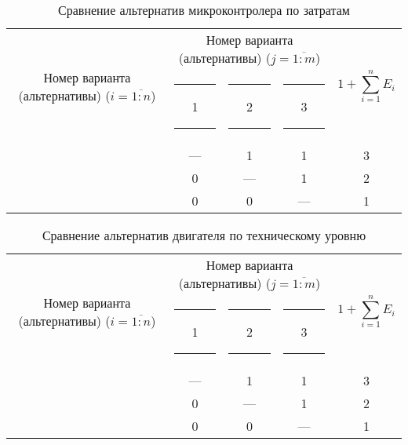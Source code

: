 \begin{table}[ht!]
    \centering
    \begin{tabular}{|c|c|c|c|c|}
        \hline
        \multirow{2}{2.4cm}[-0.5pc]{
            \centering
            Номер варианта (альтернативы) ($i = \overline{1:n}$)
        } &
        \multicolumn{3}{c|}{
            \parbox[t]{2.4cm}{
                \centering
                Номер варианта (альтернативы) ($j = \overline{1:m}$)
            }
        } &
        \multirow{2}{1.7cm}{
            \centering
            $$1 + \sum_{i=1}^n E_i$$
        } \\
        &
        \centering \rule{2pt}{0pt} 1 \rule{2pt}{0pt} &
        \centering \rule{2pt}{0pt} 2 \rule{2pt}{0pt} &
        \centering \rule{2pt}{0pt} 3 \rule{2pt}{0pt} & \\
        \hline \hline
        \centering{1} &---& 1 & 1 & 3 \\ \hline
        \centering{2} & 0 &---& 1 & 2 \\ \hline
        \centering{3} & 0 & 0 &---& 1 \\ \hline
    \end{tabular}
    \caption{Сравнение альтернатив микроконтролера по затратам}
    \label{tbl_mcu_cost_lvl_comparison}
\end{table}

\begin{table}[ht!]
    \centering
    \begin{tabular}{|c|c|c|c|c|}
        \hline
        \multirow{2}{2.4cm}[-0.5pc]{
            \centering
            Номер варианта (альтернативы) ($i = \overline{1:n}$)
        } &
        \multicolumn{3}{c|}{
            \parbox[t]{2.4cm}{
                \centering
                Номер варианта (альтернативы) ($j = \overline{1:m}$)
            }
        } &
        \multirow{2}{1.7cm}{
            \centering
            $$1 + \sum_{i=1}^n E_i$$
        } \\
        &
        \centering \rule{2pt}{0pt} 1 \rule{2pt}{0pt} &
        \centering \rule{2pt}{0pt} 2 \rule{2pt}{0pt} &
        \centering \rule{2pt}{0pt} 3 \rule{2pt}{0pt} & \\
        \hline \hline
        \centering{1} &---& 1 & 1 & 3 \\ \hline
        \centering{2} & 0 &---& 1 & 2 \\ \hline
        \centering{3} & 0 & 0 &---& 1 \\ \hline
    \end{tabular}
    \caption{Сравнение альтернатив двигателя по техническому уровню}
    \label{tbl_motor_tech_lvl_comparison}
\end{table}


